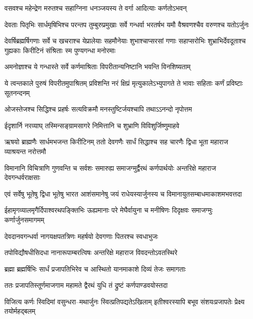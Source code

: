 \twolineshloka
{वसवश्च महेन्द्रेण मरुतश्च सहाग्निना}
{धनञ्जयस्य ते वर्गा आदित्याः कर्णतोऽभवन्}


\threelineshloka
{देवताः पितृभिः सार्धमृषिभिश्च परन्तप}
{तुम्बुरुप्रमुखाः सर्वे गन्धर्वा भरतर्षभ}
{यमौ वैश्रवणश्चैव वरुणश्च यतोऽर्जुनः}


देवर्षिब्रह्मर्षिगणाः सर्वे च खचराश्च येप्रालेयाः सहमौनेयाः शुभाश्चाप्सरसां गणाः
\twolineshloka
{सहाप्सरोभिः शुभ्राभिर्देवदूताश्च गुह्यकाः}
{किरीटिनं संश्रिताः स्म पुण्यगन्धा मनोरमाः}


\twolineshloka
{अमनोज्ञाश्च ये गन्धास्ते सर्वे कर्णमाश्रिताः}
{विपरीतान्यनिष्टानि भवन्ति विनशिष्यताम्}


\threelineshloka
{ये त्वन्तकाले पुरुषं विपरीतमुपाश्रितम्}
{प्रविशन्ति नरं क्षिप्रं मृत्युकालेऽभ्युपागते}
{ते भावाः सहिताः कर्णं प्रविष्टाः सूतनन्दनम्}


\twolineshloka
{ओजस्तेजश्च सिद्धिश्च प्रहर्षः सत्यविक्रमौ}
{मनस्तुष्टिर्जयश्चापि तथाऽऽनन्दो नृपोत्तम}


\twolineshloka
{ईदृशार्नि नरव्याघ् तस्मिन्सङ्ग्रामसागरे}
{निमित्तानि च शुभ्राणि विविशुर्जिष्णुमाहवे}


ऋषयो ब्राह्मणैः सार्धमभजन्त किरीटिनम्
\twolineshloka
{ततो देवगणैः सार्धं सिद्धाश्च सह चारणैः}
{द्विधा भूता महाराज व्याश्रयन्त नरोत्तमौ}


\threelineshloka
{विमानानि विचित्राणि गुणवन्ति च सर्वशः}
{समारुह्य समाजग्मुर्द्वैरथं कर्णपार्थयोः}
{अन्तरिक्षे महाराज देवगन्धर्वराक्षसाः}


\threelineshloka
{एवं सर्वेषु भूतेषु द्विधा भूतेषु भारत}
{आशंसमानेषु जयं राधेयस्यार्जुनस्य च}
{विमानायुतसम्बाधमाकाशमभवत्तदा}


\threelineshloka
{ईहामृगव्यालमृगैर्दिपाश्वरथपङ्क्तिभिः}
{ऊह्यमानाः परे मेघैर्वायुना च मनीषिणः}
{दिदृक्षवः समाजग्मुः कर्णार्जुनसमागमम्}


\twolineshloka
{देवदानवगन्धर्वा नागयक्षपतत्रिणः}
{महर्षयो देवगणाः पितरश्च स्वधाभुजः}


\twolineshloka
{तपोविद्यौषधीसिदधा नानारूपाम्बरत्विषः}
{अन्तरिक्षे महाराज विवदन्तोऽवतस्थिरे}


\twolineshloka
{ब्रह्मा ब्रह्मर्षिभिः सार्धं प्रजापतिभिरेव च}
{आस्थितो यानमाकाशे दिव्यं तेजः समागताः}


\twolineshloka
{ततः प्रजापतिस्तूर्णमाजगाम महामते}
{द्वैरथं युधि तं द्रुष्टं कर्णपाण्डवयोस्तदा}


\twolineshloka
{विजित्य कर्णः स्विदिमां वसुन्धरा--मथार्जुनः स्वित्प्रतिपद्यतेऽखिलाम्}
{इतीश्वरस्यापि बभूव संशयःप्रजापतेः प्रेक्ष्य तयोर्महद्बलम्}


